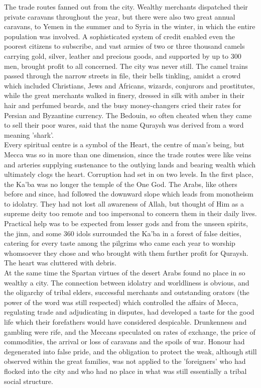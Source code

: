 \documentclass[10pt, twoside]{book}
\begin{document}
The trade routes fanned out from the city. Wealthy merchants dispatched their private caravans 
throughout the year, but there were also two great annual caravans, to Yemen in the summer and to 
Syria in the winter, in which the entire population was involved. A sophisticated system of credit 
enabled even the poorest citizens to subscribe, and vast armies of two or three thousand camels 
carrying gold, silver, leather and precious goods, and supported by up to 300 men, brought profit to 
all concerned. The city was never still. The camel trains passed through the narrow streets in file, 
their bells tinkling, amidst a crowd which included Christians, Jews and Africans, wizards, conjurors 
and prostitutes, while the great merchants walked in finery, dressed in silk with amber in their hair 
and perfumed beards, and the busy money\hyp{}changers cried their rates for Persian and Byzantine 
currency. The Bedouin, so often cheated when they came to sell their poor wares, said that the name 
Quraysh was derived from a word meaning 'shark'. \\

Every spiritual centre is a symbol of the Heart, the centre of man's being, but Mecca was so in more 
than one dimension, since the trade routes were like veins and arteries supplying sustenance to the 
outlying lands and bearing wealth which ultimately clogs the heart. Corruption had set in on two 
levels. In the first place, the Ka'ba was no longer the temple of the One God. The Arabs, like others 
before and since, had followed the downward slope which leads from monotheism to idolatry. They had 
not lost all awareness of Allah, but thought of Him as a supreme deity too remote and too impersonal 
to concern them in their daily lives. Practical help was to be expected from lesser gods and from the 
unseen spirits, the jinn, and some 360 idols surrounded the Ka'ba in a forest of false deities, 
catering for every taste among the pilgrims who came each year to worship whomsoever they chose and 
who brought with them further profit for Quraysh. The heart was cluttered with debris. \\

At the same time the Spartan virtues of the desert Arabs found no place in so wealthy a city. The 
connection between idolatry and worldliness is obvious, and the oligarchy of tribal elders, 
successful merchants and outstanding orators (the power of the word was still respected) which 
controlled the affairs of Mecca, regulating trade and adjudicating in disputes, had developed a taste 
for the good life which their forefathers would have considered despicable. Drunkenness and gambling 
were rife, and the Meccans speculated on rates of exchange, the price of commodities, the arrival or 
loss of caravans and the spoils of war. Honour had degenerated into false pride, and the obligation 
to protect the weak, although still observed within the great families, was not applied to the 
'foreigners' who had flocked into the city and who had no place in what was still essentially a 
tribal social structure. \\
\end{document}

